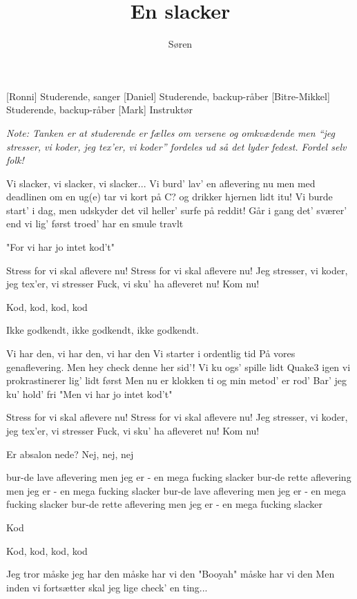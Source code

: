\documentclass[a4paper,11pt]{article}
\title{En slacker}
\author{Søren}
\begin{document}
\maketitle

\begin{roles}
[Ronni] Studerende, sanger
[Daniel] Studerende, backup-råber
[Bitre-Mikkel] Studerende, backup-råber
[Mark] Instruktør
\end{roles}


\textit{Note: Tanken er at studerende er fælles om versene og omkvædende
  men ``jeg stresser, vi koder, jeg tex'er, vi koder'' fordeles ud så det lyder
  fedest. Fordel selv folk!}



\begin{song}

  Vi slacker, vi slacker, vi slacker...
  Vi burd' lav' en aflevering nu
  men med deadlinen om en ug(e)
  tar vi kort på C? og drikker hjernen lidt itu!
  Vi burde start' i dag, men udskyder det
  vil heller' surfe på reddit!
  Går i gang
  det' sværer' end vi lig' først troed'
  har en smule travlt

  "For vi har jo intet kod't"

  Stress for vi skal aflevere nu!
  Stress for vi skal aflevere nu!
  Jeg stresser, vi koder, jeg tex'er, vi stresser
  Fuck, vi sku' ha afleveret nu!
  Kom nu!

  Kod, kod, kod, kod

  Ikke godkendt, ikke godkendt, ikke godkendt.

  Vi har den, vi har den, vi har den
  Vi starter i ordentlig tid
  På vores genaflevering.
  Men hey check denne her sid'!
  Vi ku ogs' spille lidt Quake3 igen
  vi prokrastinerer lig' lidt først
  Men nu er klokken ti
  og min metod' er rod'
  Bar' jeg ku' hold' fri
  "Men vi har jo intet kod't"

  Stress for vi skal aflevere nu!
  Stress for vi skal aflevere nu!
  Jeg stresser, vi koder, jeg tex'er, vi stresser
  Fuck, vi sku' ha afleveret nu!
  Kom nu!

  Er absalon nede?
  Nej, nej, nej

  bur-de lave aflevering
  men jeg er - en mega fucking slacker
  bur-de rette aflevering
  men jeg er - en mega fucking slacker
  bur-de lave aflevering
  men jeg er - en mega fucking slacker
  bur-de rette aflevering
  men jeg er - en mega fucking slacker

  Kod

  Kod, kod, kod, kod

  Jeg tror måske jeg har den
  måske har vi den
  "Booyah"
  måske har vi den
  Men inden vi fortsætter skal jeg lige check' en ting...

\end{song}
\end{document}
